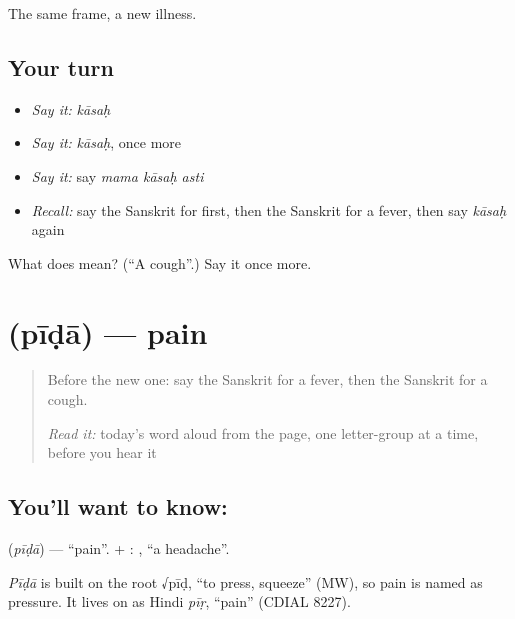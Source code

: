 \begin{grammarlens}[title={What you've built}]
The same frame, a new illness.
\end{grammarlens}

\subsection*{Your turn}
\begin{itemize}
\raggedright
  \item \emph{Say it:} \emph{kāsaḥ}
  \item \emph{Say it:} \emph{kāsaḥ}, once more
  \item \emph{Say it:} say \emph{mama kāsaḥ asti}
  \item \emph{Recall:} say the Sanskrit for first, then the Sanskrit for a fever, then say \emph{kāsaḥ} again
\end{itemize}

\begin{tcolorbox}[breakable,colback=teal!4,colframe=teal!35!black,title={Before you move on}]
What does  mean? (\textquotedblleft{}A cough\textquotedblright{}.) Say it once more.
\end{tcolorbox}
\section[\texorpdfstring{\sk{पीडा} (pīḍā)}{पीडा (pīḍā)}]{ (pīḍā) — pain}

\label{lesson:SA-C66-pain}



\begin{quote}
Before the new one: say the Sanskrit for a fever, then the Sanskrit for a cough.

\emph{Read it:} today's word aloud from the page, one letter-group at a time, before you hear it
\end{quote}

\subsection*{You'll want to know: }
\textbf{} (\emph{pīḍā}) — \textquotedblleft{}pain\textquotedblright{}. \textbf{} + \textbf{}: \textbf{}, \textquotedblleft{}a headache\textquotedblright{}.

\begin{cousinweb}
\emph{Pīḍā} is built on the root √pīḍ, \textquotedblleft{}to press, squeeze\textquotedblright{} (MW), so pain is named as pressure. It lives on as Hindi \emph{pīṛ}, \textquotedblleft{}pain\textquotedblright{} (CDIAL 8227).
\end{cousinweb}

